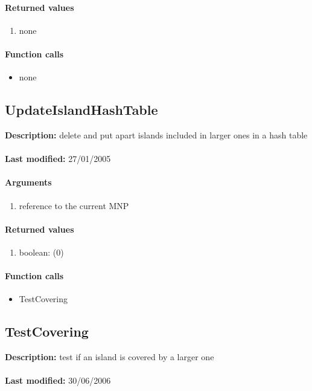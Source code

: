 \paragraph{Returned values}
\begin{enumerate}
\item none
\end{enumerate}

\paragraph{Function calls}
\begin{itemize}
\item none
\end{itemize}

\subsection{UpdateIslandHashTable}
\textbf{Description:} delete and put apart islands included in larger ones in a hash table\\
\\\textbf{Last modified:} 27/01/2005

\paragraph{Arguments}
\begin{enumerate}
\item reference to the current MNP
\end{enumerate}

\paragraph{Returned values}
\begin{enumerate}
\item boolean: (0)
\end{enumerate}

\paragraph{Function calls}
\begin{itemize}
\item TestCovering
\end{itemize}

\subsection{TestCovering}
\textbf{Description:} test if an island is covered by a larger one\\
\\\textbf{Last modified:} 30/06/2006

